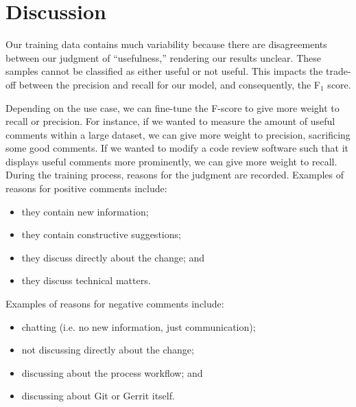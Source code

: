 \documentclass[conference]{IEEEtran}
\begin{document}





\section{Discussion}

Our training data contains much variability because there are disagreements between our judgment of ``usefulness,'' rendering our results unclear.
These samples cannot be classified as either useful or not useful.
This impacts the trade-off between the precision and recall for our model, and consequently, the F$_1$ score.

Depending on the use case, we can fine-tune the F-score to give more weight to recall or precision.
For instance, if we wanted to measure the amount of useful comments within a large dataset, we can give more weight to precision, sacrificing some good comments.
If we wanted to modify a code review software such that it displays useful comments more prominently, we can give more weight to recall.
During the training process, reasons for the judgment are recorded. Examples of reasons for positive comments include:

\begin{itemize}
	\item they contain new information;
	\item they contain constructive suggestions;
	\item they discuss directly about the change; and
	\item they discuss technical matters.
\end{itemize}

Examples of reasons for negative comments include:

\begin{itemize}
	\item chatting (i.e. no new information, just communication);
	\item not discussing directly about the change;
	\item discussing about the process workflow; and
	\item discussing about Git or Gerrit itself.
\end{itemize}
\end{document}

